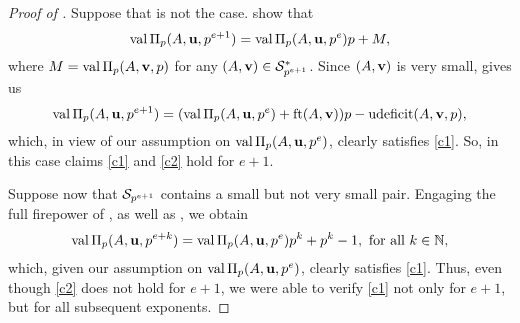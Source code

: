 \documentclass{amsart}
\begin{document}
\begin{proof}[Proof of ]
   Suppose that is not the case.
    show that
   \begin{equation}
      \label{recurrence: E}
      \val \IP_p(A,\vv{u},p^{e+1}) = \val \IP_p(A,\vv{u},p^e)p + M,
   \end{equation}
   where $M = \val\IP_p(A,\vv{v},p)$ for any  $(A,\vv{v}) \in \S^*_{p^{e+1}}$.
   Since $(A,\vv{v})$ is very small,  gives us
   \[\val \IP_p(A,\vv{u},p^{e+1}) = (\val \IP_p(A,\vv{u},p^e) + \ft{A}{\vv{v}}) p - \udeficit(A,\vv{v},p),\]
   which, in view of our assumption on $\val \IP_p(A,\vv{u},p^e)$, clearly satisfies \ref{c1}.
   So, in this case claims \ref{c1} and \ref{c2} hold for $e+1$.

   Suppose now that $\S_{p^{e+1}}$ contains a small but not very small pair.
   Engaging the full firepower of , as well as , we obtain
   \begin{equation}
      \label{tail: E}
      \val \IP_p(A,\vv{u},p^{e+k}) = \val \IP_p(A,\vv{u},p^e)p^k + p^k - 1,\text{ for all }k\in \NN,
   \end{equation}
   which, given our assumption on $\val \IP_p(A,\vv{u},p^e)$, clearly satisfies \ref{c1}.
   Thus, even though \ref{c2} does not hold for $e+1$, we were able to verify \ref{c1} not only for $e+1$, but for all subsequent exponents.
\end{proof}
\end{document}
